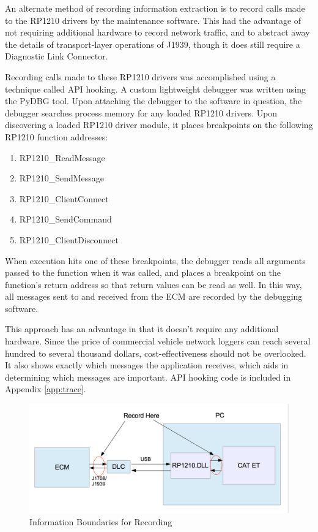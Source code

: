 An alternate method of recording information extraction is to record calls made to the RP1210 drivers
by the maintenance software. This had the advantage of not requiring additional hardware to 
record network traffic, and to abstract away the details of transport-layer operations of J1939, though it does
still require a Diagnostic Link Connector.

Recording calls made to these RP1210 drivers was accomplished using a technique called API hooking\cite{Berdajs2010}.
A custom lightweight debugger was written using the PyDBG tool. Upon attaching the debugger to the software
in question, the debugger searches process memory for any loaded RP1210 drivers. Upon discovering a loaded RP1210
driver module, it places breakpoints on the following RP1210 function addresses:

\begin{enumerate}
  \item RP1210\_ReadMessage
  \item RP1210\_SendMessage
  \item RP1210\_ClientConnect
  \item RP1210\_SendCommand
  \item RP1210\_ClientDisconnect
\end{enumerate}

When execution hits one of these breakpoints, the debugger reads all arguments passed to the function when it was called,
and places a breakpoint on the function's return address so that return values can be read as well. In this way, all
messages sent to and received from the ECM are recorded by the debugging software.

This approach has an advantage in that it doesn't require any additional hardware. Since the price of 
commercial vehicle network loggers can reach several hundred to several thousand dollars, cost-effectiveness should
not be overlooked. It also shows exactly which messages the application receives, which aids in determining which
messages are important. API hooking code is included in Appendix \ref{app:trace}.

\begin{figure}[h]
  \centering
  \includegraphics[scale=0.5]{RecordPoint}
  \caption{Information Boundaries for Recording}
  \label{fig:infoboundaries}
\end{figure}

